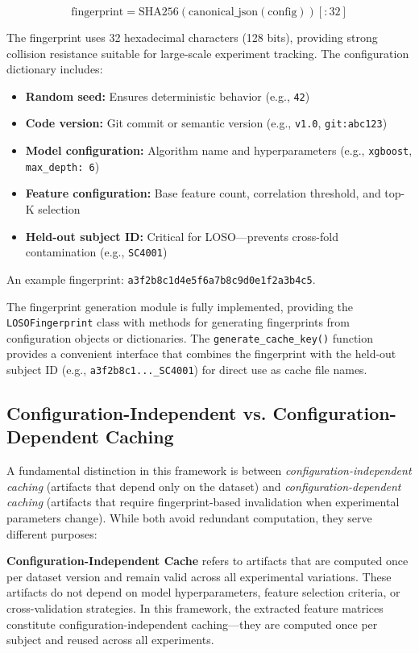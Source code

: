 \documentclass{imc-inf} %
\begin{document}
\begin{equation}
\text{fingerprint} = \text{SHA256}(\text{canonical\_json}(\text{config}))[:32]
\end{equation}

The fingerprint uses 32 hexadecimal characters (128 bits), providing strong collision resistance suitable for large-scale experiment tracking. The configuration dictionary includes:

\begin{itemize}
    \item \textbf{Random seed:} Ensures deterministic behavior (e.g., \texttt{42})
    \item \textbf{Code version:} Git commit or semantic version (e.g., \texttt{v1.0}, \texttt{git:abc123})
    \item \textbf{Model configuration:} Algorithm name and hyperparameters (e.g., \texttt{xgboost}, \texttt{max\_depth: 6})
    \item \textbf{Feature configuration:} Base feature count, correlation threshold, and top-K selection
    \item \textbf{Held-out subject ID:} Critical for LOSO---prevents cross-fold contamination (e.g., \texttt{SC4001})
\end{itemize}

An example fingerprint: \texttt{a3f2b8c1d4e5f6a7b8c9d0e1f2a3b4c5}.

The fingerprint generation module is fully implemented, providing the \texttt{LOSOFingerprint} class with methods for generating fingerprints from configuration objects or dictionaries. The \texttt{generate\_cache\_key()} function provides a convenient interface that combines the fingerprint with the held-out subject ID (e.g., \texttt{a3f2b8c1...\_SC4001}) for direct use as cache file names.

\subsection{Configuration-Independent vs. Configuration-Dependent Caching}
\label{sec:storage_vs_caching}

A fundamental distinction in this framework is between \textit{configuration-independent caching} (artifacts that depend only on the dataset) and \textit{configuration-dependent caching} (artifacts that require fingerprint-based invalidation when experimental parameters change). While both avoid redundant computation, they serve different purposes:

\textbf{Configuration-Independent Cache} refers to artifacts that are computed once per dataset version and remain valid across all experimental variations. These artifacts do not depend on model hyperparameters, feature selection criteria, or cross-validation strategies. In this framework, the extracted feature matrices constitute configuration-independent caching---they are computed once per subject and reused across all experiments.
\end{document}
